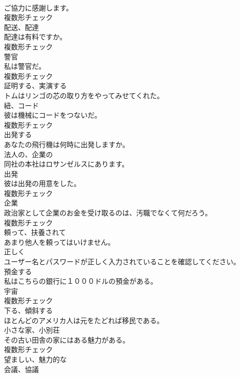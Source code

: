 \documentclass[8pt]{extreport}
\begin{document}
\begin{CJK}{UTF8}{min}
\\	ご協力に感謝します。	
\\	複数形チェック
\\	[名詞]	配送、配達	
\\	配達は有料ですか。	
\\	複数形チェック
\\	[名詞]	警官	
\\	私は警官だ。	
\\	複数形チェック
\\	[動詞]	証明する、実演する	
\\	トムはリンゴの芯の取り方をやってみせてくれた。	
\\	[名詞]	紐、コード	
\\	彼は機械にコードをつないだ。	
\\	複数形チェック
\\	[動詞]	出発する	
\\	あなたの飛行機は何時に出発しますか。	
\\	[形容詞]	法人の、企業の	
\\	同社の本社はロサンゼルスにあります。	
\\	[名詞]	出発	
\\	彼は出発の用意をした。	
\\	複数形チェック
\\	[名詞]	企業	
\\	政治家として企業のお金を受け取るのは、汚職でなくて何だろう。	
\\	複数形チェック
\\	[形容詞]	頼って、扶養されて	
\\	あまり他人を頼ってはいけません。	
\\	[副詞]	正しく	
\\	ユーザー名とパスワードが正しく入力されていることを確認してください。	
\\	[動詞]	預金する	
\\	私はこちらの銀行に１０００ドルの預金がある。	
\\	[名詞]	宇宙	
\\	複数形チェック
\\	[動詞]	下る、傾斜する	
\\	ほとんどのアメリカ人は元をたどれば移民である。	
\\	[名詞]	小さな家、小別荘	
\\	その古い田舎の家にはある魅力がある。	
\\	複数形チェック
\\	[形容詞]	望ましい、魅力的な	
\\	[名詞]	会議、協議	

\end{CJK}
\end{document}
